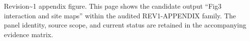 Revision\textasciitilde{}1 appendix figure. This page shows the candidate output ``Fig3 interaction and site maps'' within the audited REV1-APPENDIX family. The panel identity, source scope, and current status are retained in the accompanying evidence matrix.
